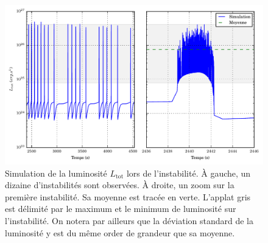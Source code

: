 \begin{figure}
  
  \includegraphics{figures/Ltot_fonction_t_doublecheeseburger.pdf}
  \caption{Simulation de la luminosité $L_\mathrm{tot}$ lors de l'instabilité. À gauche, un dizaine d'instabilités sont observées. À droite, un zoom sur la première instabilité. Sa moyenne est tracée en verte. L'applat gris est délimité par le maximum et le minimum de luminosité sur l'instabilité. On notera par ailleurs que la déviation standard de la luminosité y est du même order de grandeur que sa moyenne.}
  \label{fig:Ltot_instabilite}
\end{figure}
